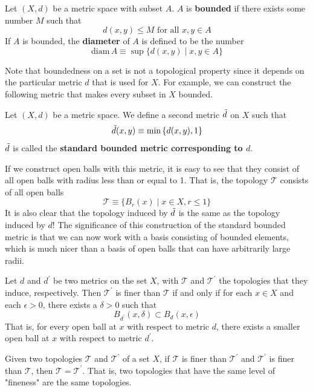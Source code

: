 \documentclass{article}
\begin{document}
    \begin{definition}
    Let $(X, d)$ be a metric space with subset $A$. $A$ is \textbf{bounded} if there exists some number $M$ such that
    \[d (x, y) \leq M \text{ for all } x,y \in A\]
    If $A$ is bounded, the \textbf{diameter} of $A$ is defined to be the number
    \[\text{diam}\, A \equiv \sup{\{d(x, y) \; | \; x, y \in A\}}\]
    \end{definition}

    Note that boundedness on a set is not a topological property since it depends on the particular metric $d$ that is used for $X$. For example, we can construct the following metric that makes every subset in $X$ bounded. 

    \begin{definition}
    Let $(X, d)$ be a metric space. We define a second metric $\Tilde{d}$ on $X$ such that
    \[\Tilde{d} (x, y) \equiv \min{\{d(x, y), 1\}}\]
    $\Tilde{d}$ is called the \textbf{standard bounded metric corresponding to $d$}. 
    \end{definition}

    If we construct open balls with this metric, it is easy to see that they consist of all open balls with radius less than or equal to 1. That is, the topology $\mathscr{T}$ consists of all open balls
    \[\mathscr{T} \equiv \{B_r (x) \; | \; x \in X, r \leq 1\}\]
    It is also clear that the topology induced by $\Tilde{d}$ is the same as the topology induced by $d$! The significance of this construction of the standard bounded metric is that we can now work with a basis consisting of bounded elements, which is much nicer than a basis of open balls that can have arbitrarily large radii.  

    \begin{lemma}
    Let $d$ and $d^\prime$ be two metrics on the set $X$, with $\mathscr{T}$ and $\mathscr{T}^\prime$ the topologies that they induce, respectively. Then $\mathscr{T}^\prime$ is finer than $\mathscr{T}$ if and only if for each $x \in X$ and each $\epsilon > 0$, there exists a $\delta > 0$ such that
    \[B_{d^\prime} (x, \delta) \subset B_d (x, \epsilon)\]
    That is, for every open ball at $x$ with respect to metric $d$, there exists a smaller open ball at $x$ with respect to metric $d^\prime$. 
    \end{lemma}

    \begin{corollary}
    Given two topologies $\mathscr{T}$ and $\mathscr{T}^\prime$ of a set $X$, if $\mathscr{T}$ is finer than $\mathscr{T}^\prime$ and $\mathscr{T}^\prime$ is finer than $\mathscr{T}$, then $\mathscr{T} = \mathscr{T}^\prime$. That is, two topologies that have the same level of "fineness" are the same topologies. 
    \end{corollary}
\end{document}
